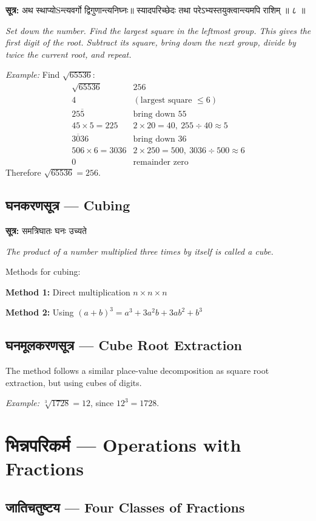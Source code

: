 \documentclass[10pt,a4paper]{article}
\newcommand{\sutratxt}[2]{%
  \begin{center}%
  \colorbox{sanskritbg}{%
    \begin{minipage}{0.93\textwidth}%
    \centering\small\vspace{3pt}%
    {\devanagarifont\textbf{सूत्र:} #1}\par\vspace{2pt}%
    \textit{#2}\vspace{3pt}%
    \end{minipage}%
  }%
  \end{center}%
  \vspace{0.1em}%
}
\begin{document}
\sutratxt{अथ स्थाप्योSन्त्यवर्गो द्विगुणान्त्यनिघ्नः॥ स्यादपरिच्छेदः तथा परेऽभ्यस्तयुक्त्वान्त्यमपि राशिम् ॥ ८ ॥}{Set down the number. Find the largest square in the leftmost group. This gives the first digit of the root. Subtract its square, bring down the next group, divide by twice the current root, and repeat.}

\textit{Example:} Find $\sqrt{65536}$:
\[
\begin{array}{r|l}
\sqrt{65536} & 256 \\
\hline
4 & (\text{largest square } \leq 6) \\
25\overline{5} & \text{bring down 55} \\
45 \times 5 = 225 & 2 \times 20 = 40,\ 255 \div 40 \approx 5 \\
\overline{303}6 & \text{bring down 36} \\
506 \times 6 = 3036 & 2 \times 250 = 500,\ 3036 \div 500 \approx 6 \\
0 & \text{remainder zero}
\end{array}
\]
Therefore $\sqrt{65536} = 256$.

\subsection{घनकरणसूत्र — Cubing}

\sutratxt{समत्रिघातः घनः उच्यते}{The product of a number multiplied three times by itself is called a cube.}

Methods for cubing:

\textbf{Method 1:} Direct multiplication $n \times n \times n$

\textbf{Method 2:} Using $(a+b)^3 = a^3 + 3a^2b + 3ab^2 + b^3$

\subsection{घनमूलकरणसूत्र — Cube Root Extraction}

The method follows a similar place-value decomposition as square root extraction, but using cubes of digits.

\textit{Example:} $\sqrt[3]{1728} = 12$, since $12^3 = 1728$.

\section{भिन्नपरिकर्म — Operations with Fractions}
\label{sec:bhinna}

\subsection{जातिचतुष्टय — Four Classes of Fractions}
\end{document}
